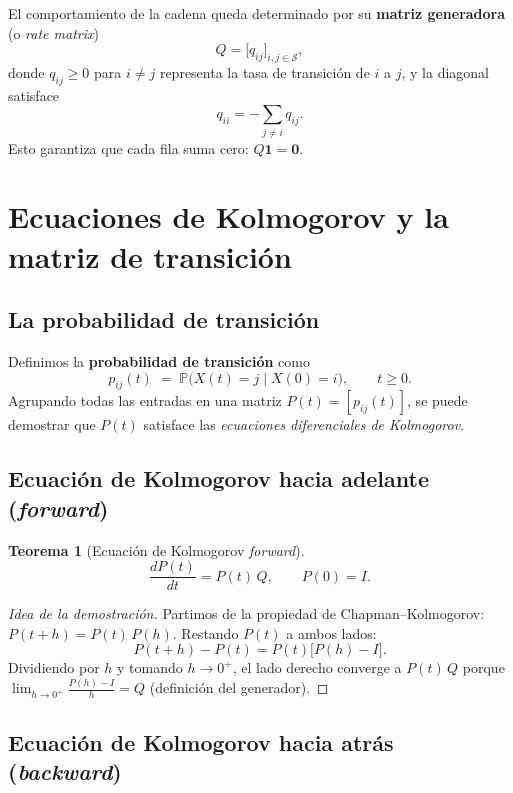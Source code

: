 \documentclass[11pt,a4paper]{article}
\theoremstyle{definition}
\newtheorem{teorema}{Teorema}[section]
\theoremstyle{remark}
\newcommand{\Prob}{\mathbb{P}}
\begin{document}
El comportamiento de la cadena queda determinado por su \textbf{matriz
generadora} (o \emph{rate matrix})
\[
  Q = \bigl[q_{ij}\bigr]_{i,j \in \mathcal{S}},
\]
donde $q_{ij} \ge 0$ para $i \ne j$ representa la tasa de transición de
$i$ a $j$, y la diagonal satisface
\[
  q_{ii} = -\sum_{j \ne i} q_{ij}.
\]
Esto garantiza que cada fila suma cero: $Q\mathbf{1} = \mathbf{0}$.

\section{Ecuaciones de Kolmogorov y la matriz de transición}

\subsection{La probabilidad de transición}

Definimos la \textbf{probabilidad de transición} como
\[
  p_{ij}(t) \;=\; \Prob\bigl(X(t) = j \mid X(0) = i\bigr),
  \qquad t \ge 0.
\]
Agrupando todas las entradas en una matriz $P(t) = [p_{ij}(t)]$, se
puede demostrar que $P(t)$ satisface las \emph{ecuaciones diferenciales
de Kolmogorov}.

\subsection{Ecuación de Kolmogorov hacia adelante (\textit{forward})}

\begin{teorema}[Ecuación de Kolmogorov \emph{forward}]
\[
  \frac{dP(t)}{dt} = P(t)\,Q, \qquad P(0) = I.
\]
\end{teorema}

\begin{proof}[Idea de la demostración]
Partimos de la propiedad de Chapman--Kolmogorov:
$P(t+h) = P(t)\,P(h)$.  Restando $P(t)$ a ambos lados:
\[
  P(t+h) - P(t) = P(t)\bigl[P(h) - I\bigr].
\]
Dividiendo por $h$ y tomando $h \to 0^+$, el lado derecho converge a
$P(t)\,Q$ porque $\lim_{h\to 0^+} \frac{P(h)-I}{h} = Q$ (definición del
generador).
\end{proof}

\subsection{Ecuación de Kolmogorov hacia atrás (\textit{backward})}
\end{document}
